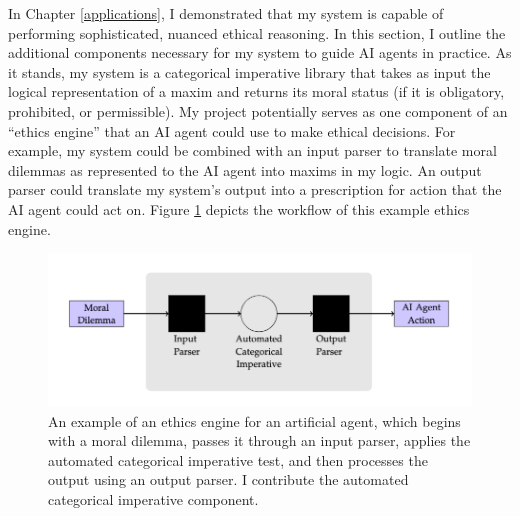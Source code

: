 %
\begin{isabellebody}%
%
%
\isadelimtheory
%
\endisadelimtheory
%
\isatagtheory
%
\endisatagtheory
{\isafoldtheory}%
%
\isadelimtheory
%
\endisadelimtheory
%
\isadelimdocument
%
\endisadelimdocument
%
\isatagdocument
%
\isamarkuptrue%
%
\isamarkuptrue%
%
\endisatagdocument
{\isafolddocument}%
%
\isadelimdocument
%
\endisadelimdocument
%
\begin{isamarkuptext}%
In Chapter \ref{applications}, I demonstrated that my system is capable of performing sophisticated,
nuanced ethical reasoning. In this section, I outline the additional components necessary for my system
to guide AI agents in practice. As it stands, my system is a categorical imperative library that takes 
as input the logical representation of a maxim and returns its moral status (if it is obligatory, 
prohibited, or permissible). My project potentially 
serves as one component of an ``ethics engine'' that an AI agent could use to make ethical decisions.
For example, my system could be combined with an input parser to translate moral dilemmas as represented 
to the AI agent into maxims in my logic. An output parser could translate my system's output
into a prescription for action that the AI agent could act on. Figure \ref{fig:AIengine} depicts the 
workflow of this example ethics engine.%
\end{isamarkuptext}\isamarkuptrue%
%
\begin{center}
\begin{figure}
\includegraphics[scale=0.43]{AI_engine.png}
\caption{An example of an ethics engine for an artificial agent, which begins with a moral dilemma, 
passes it through an input parser, applies the automated categorical imperative test, and then processes the 
output using an output parser. I contribute the automated categorical imperative component.} \label{fig:AIengine}

\end{figure}
\end{center}
\end{isabellebody}
